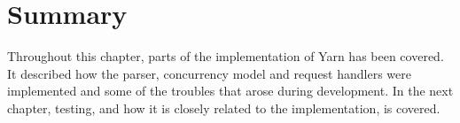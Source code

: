 \section{Summary} %
Throughout this chapter, parts of the implementation of Yarn has been covered.
It described how the parser, concurrency model and request handlers were
implemented and some of the troubles that arose during development. In the
next chapter, testing, and how it is closely related to the implementation, is
covered.
